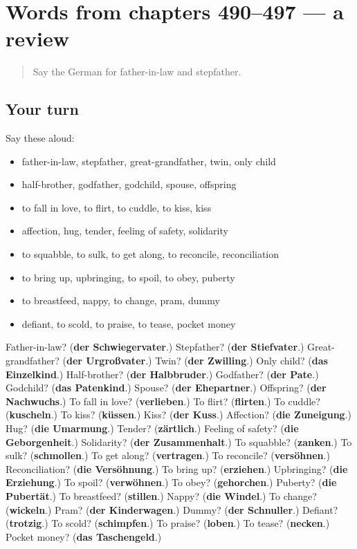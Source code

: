 \section[(dialogue)]{Words from chapters 490–497 — a review}

\label{lesson:GE-R497-review-490-497}



\begin{quote}
Say the German for father-in-law and stepfather.
\end{quote}

\subsection*{Your turn}
Say these aloud:

\begin{itemize}
\raggedright
  \item father-in-law, stepfather, great-grandfather, twin, only child
  \item half-brother, godfather, godchild, spouse, offspring
  \item to fall in love, to flirt, to cuddle, to kiss, kiss
  \item affection, hug, tender, feeling of safety, solidarity
  \item to squabble, to sulk, to get along, to reconcile, reconciliation
  \item to bring up, upbringing, to spoil, to obey, puberty
  \item to breastfeed, nappy, to change, pram, dummy
  \item defiant, to scold, to praise, to tease, pocket money
\end{itemize}

\begin{tcolorbox}[breakable,colback=teal!4,colframe=teal!35!black,title={Before you move on}]
Father-in-law? (\textbf{der Schwiegervater}.) Stepfather? (\textbf{der Stiefvater}.) Great-grandfather? (\textbf{der Urgroßvater}.) Twin? (\textbf{der Zwilling}.) Only child? (\textbf{das Einzelkind}.) Half-brother? (\textbf{der Halbbruder}.) Godfather? (\textbf{der Pate}.) Godchild? (\textbf{das Patenkind}.) Spouse? (\textbf{der Ehepartner}.) Offspring? (\textbf{der Nachwuchs}.) To fall in love? (\textbf{verlieben}.) To flirt? (\textbf{flirten}.) To cuddle? (\textbf{kuscheln}.) To kiss? (\textbf{küssen}.) Kiss? (\textbf{der Kuss}.) Affection? (\textbf{die Zuneigung}.) Hug? (\textbf{die Umarmung}.) Tender? (\textbf{zärtlich}.) Feeling of safety? (\textbf{die Geborgenheit}.) Solidarity? (\textbf{der Zusammenhalt}.) To squabble? (\textbf{zanken}.) To sulk? (\textbf{schmollen}.) To get along? (\textbf{vertragen}.) To reconcile? (\textbf{versöhnen}.) Reconciliation? (\textbf{die Versöhnung}.) To bring up? (\textbf{erziehen}.) Upbringing? (\textbf{die Erziehung}.) To spoil? (\textbf{verwöhnen}.) To obey? (\textbf{gehorchen}.) Puberty? (\textbf{die Pubertät}.) To breastfeed? (\textbf{stillen}.) Nappy? (\textbf{die Windel}.) To change? (\textbf{wickeln}.) Pram? (\textbf{der Kinderwagen}.) Dummy? (\textbf{der Schnuller}.) Defiant? (\textbf{trotzig}.) To scold? (\textbf{schimpfen}.) To praise? (\textbf{loben}.) To tease? (\textbf{necken}.) Pocket money? (\textbf{das Taschengeld}.)
\end{tcolorbox}
